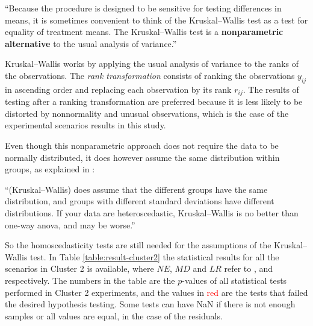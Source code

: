 \begin{displayquote}

``Because the procedure is designed to be sensitive for testing differences in means, it is sometimes convenient to think of the Kruskal–Wallis test as a test for equality of treatment means. The Kruskal–Wallis test is a \textbf{nonparametric alternative} to the usual analysis of variance.''

\end{displayquote}

Kruskal–Wallis works by applying the usual analysis of variance to the ranks of the observations. The \textit{rank transformation} consists of ranking the observations $y_{ij}$ in ascending order and replacing each observation by its rank $r_{ij}$. The results of testing after a ranking transformation are preferred because it is less likely to be distorted by nonnormality and unusual observations, which is the case of the experimental scenarios results in this study.

Even though this nonparametric approach does not require the data to be normally distributed, it does however assume the same distribution within groups, as explained in \cite{mcdonald2009handbook}:

\begin{displayquote}
    ``(Kruskal–Wallis) does assume that the different groups have the same distribution, and groups with different standard deviations have different distributions. If your data are heteroscedastic, Kruskal–Wallis is no better than one-way anova, and may be worse.''
\end{displayquote}

So the homoscedasticity tests are still needed for the assumptions of the Kruskal–Wallis test. In Table \ref{table:result-cluster2} the statistical results for all the scenarios in Cluster 2 is available, where $NE$, $MD$ and $LR$ refer to ,  and  respectively. The numbers in the table are the $p$-values of all statistical tests performed in Cluster 2 experiments, and the values in \textcolor{red}{red} are the tests that failed the desired hypothesis testing. Some tests can have NaN if there is not enough samples or all values are equal, in the case of the residuals.

